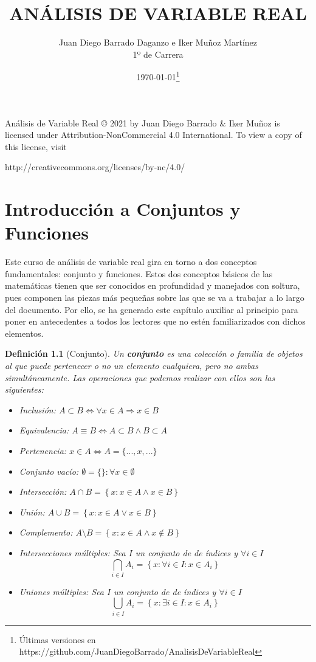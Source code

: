 \documentclass[10pt,a4paper,openright]{book}
\title{ANÁLISIS DE VARIABLE REAL}
\author{Juan Diego Barrado Daganzo e Iker Muñoz Martínez\\1º de Carrera} %
\date{\today\footnote{Últimas versiones en https://github.com/JuanDiegoBarrado/AnalisisDeVariableReal}}
\theoremstyle{break}
\newtheorem*{defi}{Definición}
\begin{document}
\maketitle
\frontmatter
Análisis de Variable Real © 2021 by Juan Diego Barrado \& Iker Muñoz is licensed under Attribution-NonCommercial 4.0 International. To view a copy of this license, visit
\begin{center}
http://creativecommons.org/licenses/by-nc/4.0/
\end{center}

\hypersetup{linkcolor=black}
\setcounter{tocdepth}{3}%
\setcounter{secnumdepth}{4}%
\tableofcontents
\hypersetup{linkcolor=blue}

\mainmatter
\chapter{Introducción a Conjuntos y Funciones}
Este curso de análisis de variable real gira en torno a dos conceptos fundamentales: conjunto y funciones. Estos dos conceptos básicos de las matemáticas tienen que ser conocidos en profundidad y manejados con soltura, pues componen las piezas más pequeñas sobre las que se va  a trabajar a lo largo del documento. Por ello, se ha generado este capítulo auxiliar al principio para poner en antecedentes a todos los lectores que no estén familiarizados con dichos elementos.

\begin{defi}[Conjunto]
Un \textbf{conjunto} es una colección o familia de objetos al que puede pertenecer o no un elemento cualquiera, pero no ambas simultáneamente. Las operaciones que podemos realizar con ellos son las siguientes:
\begin{itemize}
\item Inclusión: $A\subset B \Leftrightarrow \forall x \in A \Rightarrow x \in B$
\item Equivalencia: $A \equiv B \Leftrightarrow A \subset B \wedge B \subset A$
\item Pertenencia: $x \in A \Leftrightarrow A=\{...,x,...\}$
\item Conjunto vacío: $\emptyset=\{\}: \forall x \in \emptyset$
\item Intersección: $A \cap B=\left\lbrace x: x\in A \wedge x\in B \right\rbrace$
\item Unión: $A \cup B=\left\lbrace x: x\in A \vee x\in B \right\rbrace$
\item Complemento: $A \mbox{\textbackslash} B=\left\lbrace x: x\in A \wedge x\notin B \right\rbrace$
\item Intersecciones múltiples: Sea $I$ un conjunto de de índices y $\forall i \in I$
$$\bigcap_{i\in I}A_i=\left\lbrace x: \forall i \in I : x\in A_i\right\rbrace$$
\item Uniones múltiples: Sea $I$ un conjunto de de índices y $\forall i \in I$
$$\bigcup_{i\in I}A_i=\left\lbrace x: \exists i \in I: x\in A_i\right\rbrace$$
\end{itemize}
\end{defi}
\end{document}
